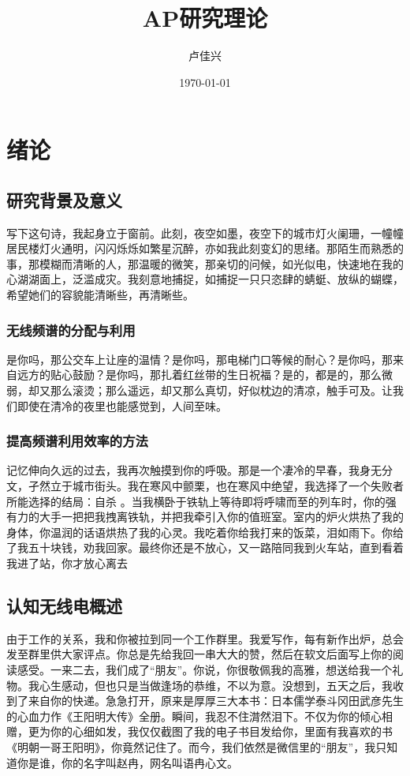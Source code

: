 \documentclass[a4paper,12pt]{report}
\begin{document}
\songti{}%
\title{AP研究理论}  %
\author{卢佳兴}  %
\date{\today}    %
\maketitle 
\tableofcontents


\chapter{绪论}
\section{研究背景及意义}
写下这句诗，我起身立于窗前。此刻，夜空如墨，夜空下的城市灯火阑珊，一幢幢居民楼灯火通明，闪闪烁烁如繁星沉醉，亦如我此刻变幻的思绪。那陌生而熟悉的事，那模糊而清晰的人，那温暖的微笑，那亲切的问候，如光似电，快速地在我的心湖湖面上，泛滥成灾。我刻意地捕捉，如捕捉一只只恣肆的蜻蜓、放纵的蝴蝶，希望她们的容貌能清晰些，再清晰些。
\subsection{无线频谱的分配与利用}
是你吗，那公交车上让座的温情？是你吗，那电梯门口等候的耐心？是你吗，那来自远方的贴心鼓励？是你吗，那扎着红丝带的生日祝福？是的，都是的，那么微弱，却又那么滚烫；那么遥远，却又那么真切，好似枕边的清凉，触手可及。让我们即使在清冷的夜里也能感觉到，人间至味。
\subsection{提高频谱利用效率的方法}
记忆伸向久远的过去，我再次触摸到你的呼吸。那是一个凄冷的早春，我身无分文，孑然立于城市街头。我在寒风中颤栗，也在寒风中绝望，我选择了一个失败者所能选择的结局：自杀 。当我横卧于铁轨上等待即将呼啸而至的列车时，你的强有力的大手一把把我拽离铁轨，并把我牵引入你的值班室。室内的炉火烘热了我的身体，你温润的话语烘热了我的心灵。我吃着你给我打来的饭菜，泪如雨下。你给了我五十块钱，劝我回家。最终你还是不放心，又一路陪同我到火车站，直到看着我进了站，你才放心离去
\section{认知无线电概述}
由于工作的关系，我和你被拉到同一个工作群里。我爱写作，每有新作出炉，总会发至群里供大家评点。你总是先给我回一串大大的赞，然后在软文后面写上你的阅读感受。一来二去，我们成了“朋友”。你说，你很敬佩我的高雅，想送给我一个礼物。我心生感动，但也只是当做逢场的恭维，不以为意。没想到，五天之后，我收到了来自你的快递。急急打开，原来是厚厚三大本书：日本儒学泰斗冈田武彦先生的心血力作《王阳明大传》全册。瞬间，我忍不住潸然泪下。不仅为你的倾心相赠，更为你的心细如发，我仅仅截图了我的电子书目发给你，里面有我喜欢的书《明朝一哥王阳明》，你竟然记住了。而今，我们依然是微信里的“朋友”，我只知道你是谁，你的名字叫赵冉，网名叫语冉心文。
\end{document}
